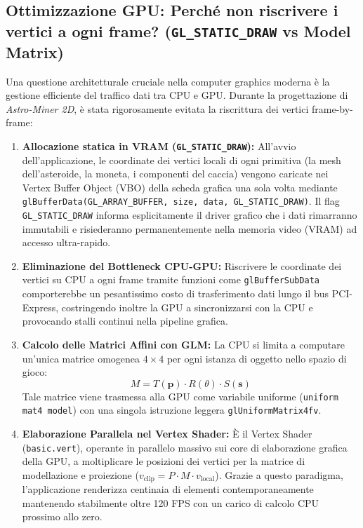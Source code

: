 \documentclass[11pt,a4paper]{article}
\begin{document}
\subsection{Ottimizzazione GPU: Perché non riscrivere i vertici a ogni frame? (\texttt{GL\_STATIC\_DRAW} vs Model Matrix)}
Una questione architetturale cruciale nella computer graphics moderna è la gestione efficiente del traffico dati tra CPU e GPU. Durante la progettazione di \textit{Astro-Miner 2D}, è stata rigorosamente evitata la riscrittura dei vertici frame-by-frame:
\begin{enumerate}
    \item \textbf{Allocazione statica in VRAM (\texttt{GL\_STATIC\_DRAW}):} All'avvio dell'applicazione, le coordinate dei vertici locali di ogni primitiva (la mesh dell'asteroide, la moneta, i componenti del caccia) vengono caricate nei Vertex Buffer Object (VBO) della scheda grafica una sola volta mediante \texttt{glBufferData(GL\_ARRAY\_BUFFER, size, data, GL\_STATIC\_DRAW)}. Il flag \texttt{GL\_STATIC\_DRAW} informa esplicitamente il driver grafico che i dati rimarranno immutabili e risiederanno permanentemente nella memoria video (VRAM) ad accesso ultra-rapido.
    \item \textbf{Eliminazione del Bottleneck CPU-GPU:} Riscrivere le coordinate dei vertici su CPU a ogni frame tramite funzioni come \texttt{glBufferSubData} comporterebbe un pesantissimo costo di trasferimento dati lungo il bus PCI-Express, costringendo inoltre la GPU a sincronizzarsi con la CPU e provocando stalli continui nella pipeline grafica.
    \item \textbf{Calcolo delle Matrici Affini con GLM:} La CPU si limita a computare un'unica matrice omogenea $4 \times 4$ per ogni istanza di oggetto nello spazio di gioco:
    \begin{equation}
    M = T(\mathbf{p}) \cdot R(\theta) \cdot S(\mathbf{s})
    \end{equation}
    Tale matrice viene trasmessa alla GPU come variabile uniforme (\texttt{uniform mat4 model}) con una singola istruzione leggera \texttt{glUniformMatrix4fv}.
    \item \textbf{Elaborazione Parallela nel Vertex Shader:} È il Vertex Shader (\texttt{basic.vert}), operante in parallelo massivo sui core di elaborazione grafica della GPU, a moltiplicare le posizioni dei vertici per la matrice di modellazione e proiezione ($v_{\text{clip}} = P \cdot M \cdot v_{\text{local}}$). Grazie a questo paradigma, l'applicazione renderizza centinaia di elementi contemporaneamente mantenendo stabilmente oltre 120 FPS con un carico di calcolo CPU prossimo allo zero.
\end{enumerate}
\end{document}
